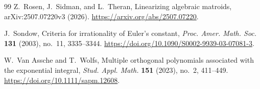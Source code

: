\documentclass[11pt]{article}
\theoremstyle{definition}
\theoremstyle{remark}
\begin{document}
\begin{thebibliography}{99}
Z.~Rosen, J.~Sidman, and L.~Theran,
\newblock Linearizing algebraic matroids,
\newblock arXiv:2507.07220v3 (2026).
\newblock \url{https://arxiv.org/abs/2507.07220}.

J.~Sondow,
\newblock Criteria for irrationality of Euler's constant,
\newblock \emph{Proc. Amer. Math. Soc.} \textbf{131} (2003), no.~11,
3335--3344.
\newblock \url{https://doi.org/10.1090/S0002-9939-03-07081-3}.

W.~Van Assche and T.~Wolfs,
\newblock Multiple orthogonal polynomials associated with the exponential
integral,
\newblock \emph{Stud. Appl. Math.} \textbf{151} (2023), no.~2, 411--449.
\newblock \url{https://doi.org/10.1111/sapm.12608}.

\end{thebibliography}
\end{document}
